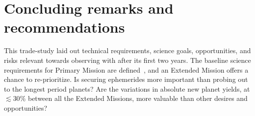 \section{Concluding remarks and recommendations}
\label{sec:conclusions}

This trade-study laid out technical requirements, science goals, opportunities, and risks relevant towards observing with \tess after its first two years.
The baseline science requirements for \tesss Primary Mission are defined~\citep{ricker_transiting_2014}, and an Extended Mission offers a chance to re-prioritize.
Is securing \tesss ephemerides more important than probing out to the longest period planets? 
Are the variations in absolute new planet yields, at $\lesssim30\%$ between all the Extended Missions, more valuable than other desires and opportunities?



